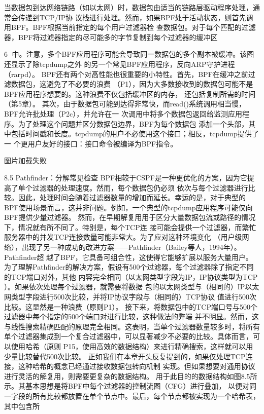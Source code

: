 当数据包到达网络链路（如以太网）时，数据包由适当的链路层驱动程序处理，通常会传递到TCP/IP协
议栈进行处理。然而，如果BPF处于活动状态，则首先调用BPF。BPF根据当前指定的每个用户过滤器检
查数据包。对于每个匹配的过滤器，BPF将过滤器指定的尽可能多的字节复制到每个过滤器的缓冲区

                                                 6
中。注意，多个BPF应用程序可能会导致同一数据包的多个副本被缓冲。该图还显示了除tcpdump之外
的另一个常见BPF应用程序，反向ARP守护进程（rarpd）。
BPF还有两个对高性能也很重要的小特性。首先，BPF在缓冲之前过滤数据包，这避免了不必要的浪费
（P1），因为大多数接收到的数据包可能不是BPF应用程序想要的。这种浪费不仅包括缓冲区的内存，
还包括复制所需的时间（第5章）。
其次，由于数据包可能到达得非常快，而read()系统调用相当慢，BPF允许批处理（P2c），并允许在一
次调用中将多个数据包返回给监测应用程序。为了处理这个问题并区分数据包边界，BPF为每个数据包
添加一个头部，其中包括时间戳和长度。tcpdump的用户不必使用这个接口；相反，tcpdump提供了一
个更用户友好的接口：接口命令被编译为BPF指令。

 图片加载失败

8.5 Pathfinder：分解常见检查
BPF相较于CSPF是一种更优化的方案，因为它提高了单个过滤器的处理速度。然而，每个数据包仍必须
依次与每个过滤器进行比较。因此，处理时间会随着过滤器数量的增加而延长。幸运的是，对于典型的
BPF使用场景而言，这并非问题。例如，一个典型的tcpdump应用程序可能仅向BPF提供少量过滤器。
然而，在早期解复用用于区分大量数据包流或路径的情况下，情况就有所不同了。特别是，每个TCP连
接可能会提供一个过滤器，而繁忙服务器中的并发TCP连接数量可能非常大。为了应对这种环境变化
（用户级网络），出现了另一种成功的改进方案——Pathfinder（Bailey等人，1994年）。Pathfinder超
越了BPF，它具备可组合性，这使得它能够扩展以服务大量用户。
为了理解Pathfinder的解决方案，假设有500个过滤器，每个过滤器除了指定不同的TCP端口对外，其他
内容完全相同（以太网类型字段为IP，IP协议类型为TCP ）。如果依次处理每个过滤器，就需要将数据
包的以太网类型与（相同的）IP以太网类型字段进行500次比较，并将IP协议字段与（相同的）TCP协议
值进行500次比较。这显然是一种浪费（原则P1）。
接下来，将数据包中的TCP端口号与500个过滤器中每个指定的500个端口对进行比较，这种做法的弊端
并不明显。然而，这与线性搜索精确匹配的原理完全相同。这表明，当单个过滤器数量较多时，将所有
单个过滤器集成到一个复合过滤器中，可以显著减少不必要的比较。具体而言，可以使用哈希（原则
P15，使用高效的数据结构）来进行精确搜索，这样就可以用少量比较替代500次比较。
正如我们在本章开头反复提到的，如果仅处理TCP连接，这种哈希的概念已经通过接收数据包转向机制
实现。但如果想要对通用协议进行灵活的解复用，则需要更复杂的数据结构。
用于此目的的数据结构如图8.5所示。其基本思想是将BPF中每个过滤器的控制流图（CFG）进行叠加，
以便对同一字段的所有比较都放置在单个节点中。最后，每个节点都被实现为一个哈希表，其中包含所

